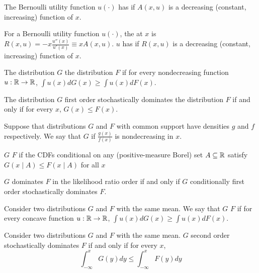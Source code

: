 \documentclass[12pt]{article}
\begin{document}
\begin{definition}
	The Bernoulli utility function $u(\cdot)$ has  if $A(x,u)$ is a decreasing (constant, increasing) function of $x$.
\end{definition}

\begin{definition}
	For a Bernoulli utility function $u(\cdot)$, the  at $x$ is $R(x,u) = -x \frac{u''(x)}{u'(x)} \equiv xA(x,u)$. $u$ has  if $R(x,u)$ is a decreasing (constant, increasing) function of $x$.
\end{definition}

\begin{definition}
	The distribution $G$  the distribution $F$ if for every nondecreasing function $u: \mathbb{R} \to \mathbb{R}$, $\int u(x)dG(x) \ge \int u(x)dF(x)$. 
\end{definition}
\begin{proposition}
	The distribution $G$ first order stochastically dominates the distribution $F$ if and only if for every $x$, $G(x) \le F(x)$.
\end{proposition}

\begin{definition}
	Suppose that distributions $G$ and $F$ with common support have densities $g$ and $f$ respectively. We say that $G$  if $\frac{g(x)}{f(x)}$ is nondecreasing in $x$.
\end{definition}
\begin{definition}
	$G$  $F$ if the CDFs conditional on any (positive-measure Borel) set $A \subseteq \mathbb{R}$ satisfy $G(x \mid A) \le F(x \mid A)$ for all $x$
\end{definition}

\begin{proposition}
	$G$ dominates $F$ in the likelihood ratio order if and only if $G$ conditionally first order stochastically dominates $F$.
\end{proposition}

\begin{definition}
	Consider two distributions $G$ and $F$ with the same mean. We say that $G$  $F$ if for every concave function $u: \mathbb{R} \to \mathbb{R}$, $\int u(x)dG(x) \ge \int u(x) dF(x)$.
\end{definition}
\begin{proposition}
	Consider two distributions $G$ and $F$ with the same mean. $G$ second order stochastically dominates $F$ if and only if for every $x$,
	\[
	\int_{-\infty}^x G(y) dy \le \int_{-\infty}^x F(y)dy
	\]
\end{proposition}
\end{document}
